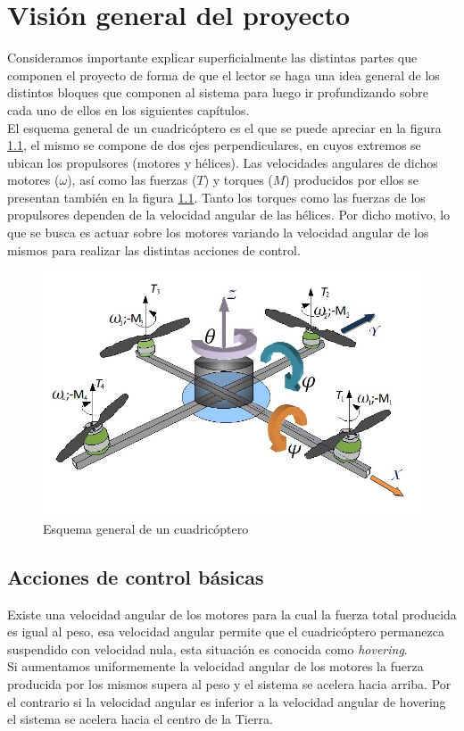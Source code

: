 \documentclass[main]{subfiles}
\begin{document}
\chapter{Visi\'on general del proyecto}
\label{chap:general}
Consideramos importante explicar superficialmente las distintas partes que componen el proyecto de forma de que el lector se haga una idea general de los distintos bloques que componen al sistema para luego ir profundizando sobre cada uno de ellos en los siguientes cap\'itulos.\\

El esquema general de un cuadric\'optero es el que se puede apreciar en la figura \ref{fig:cuad}, el mismo se compone de dos ejes perpendiculares, en cuyos extremos se ubican los propulsores (motores y h\'elices). Las velocidades angulares de dichos motores ($\omega$), as\'i como las fuerzas ($T$) y torques ($M$) producidos por ellos se presentan tambi\'en en la figura \ref{fig:cuad}. Tanto los torques como las fuerzas de los propulsores dependen de la velocidad angular de las h\'elices. Por dicho motivo, lo que se busca es actuar sobre los motores variando la velocidad angular de los mismos para realizar las distintas acciones de control.

\begin{figure}
\centering
\includegraphics[scale=0.4]{./pics_general/quad_hov.jpg}
\caption{Esquema general de un cuadric\'optero}
\label{fig:cuad}
\end{figure}
\section{Acciones de control b\'asicas}
Existe una velocidad angular de los motores para la cual la fuerza total producida es igual al peso, esa velocidad angular permite que el cuadric\'optero permanezca suspendido con velocidad nula, esta situaci\'on es conocida como \emph{hovering}.\\ Si aumentamos uniformemente la velocidad angular de los motores la fuerza producida por los mismos supera al peso y el sistema se acelera hacia arriba. Por el contrario si la velocidad angular es inferior a la velocidad angular de hovering el sistema se acelera hacia el centro de la Tierra.\\
\end{document}
